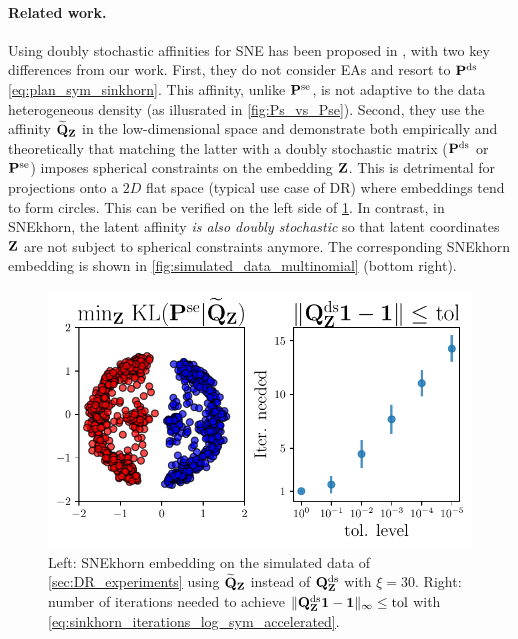 \paragraph{Related work.}
    Using doubly stochastic affinities for SNE has been proposed in \cite{lu2019doubly}, with two key differences from our work. First, they
    do not consider EAs and resort to $\mathbf{P}^{\mathrm{ds}}$ \eqref{eq:plan_sym_sinkhorn}. This affinity, unlike $\mathbf{P}^{\mathrm{se}}$, is not adaptive to the data heterogeneous density (as illusrated in \cref{fig:Ps_vs_Pse}). 
    Second, they use the affinity $\widetilde{\mathbf{Q}}_{\mathbf{Z}}$ in the low-dimensional space and demonstrate both empirically and theoretically that matching the latter with a doubly stochastic matrix (\eg $\mathbf{P}^{\mathrm{ds}}$ or $\mathbf{P}^{\mathrm{se}}$) imposes spherical constraints on the embedding $\mathbf{Z}$.
    This is detrimental for projections onto a $2D$ flat space (typical use case of DR) where embeddings tend to form circles. This can be verified on the left side of \cref{fig:snekhorn_not_DS}. In contrast, in SNEkhorn, the latent affinity \emph{is also doubly stochastic} so that latent coordinates $\mathbf{Z}$ are not subject to spherical constraints anymore.
    The corresponding SNEkhorn embedding is shown in \cref{fig:simulated_data_multinomial} (bottom right).

\begin{figure}
    \centering
    \includegraphics[width=0.6\linewidth]{figures/SNEkhorn/snekhorn_not_DS.pdf}    
    \caption{Left: SNEkhorn embedding on the simulated data of \cref{sec:DR_experiments} using $\widetilde{\mathbf{Q}}_{\mathbf{Z}}$ instead of $\mathbf{Q}^{\mathrm{ds}}_{\mathbf{Z}}$ with $\xi=30$. Right: number of iterations needed to achieve $\| \mathbf{Q}^{\mathrm{ds}}_{\mathbf{Z}} \bm{1} - \bm{1} \|_{\infty} \leq \text{tol}$ with \eqref{eq:sinkhorn_iterations_log_sym_accelerated}.}
    \label{fig:snekhorn_not_DS}
\end{figure}
